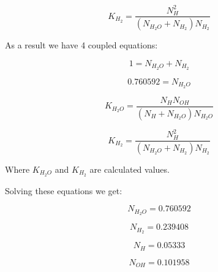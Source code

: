 \documentclass[12pt, Times New Roman]{article}
\begin{document}
    \begin{equation}
        K_{H_{2}} = \frac{N_{H}^{2}}{(N_{H_{2}O} + N_{H_{2}}) N_{H_{2}}}
    \end{equation}

    As a result we have 4 coupled equations:

    \begin{equation}
        1 = N_{H_{2}O} + N_{H_{2}}
    \end{equation}

    \begin{equation}
        0.760592 = N_{H_{2}O}
    \end{equation}

    \begin{equation}
        K_{H_{2}O} = \frac{N_{H} N_{OH}}{(N_{H} + N_{H_{2}O}) N_{H_{2}O}}
    \end{equation}

    \begin{equation}
        K_{H_{2}} = \frac{N_{H}^{2}}{(N_{H_{2}O} + N_{H_{2}}) N_{H_{2}}}
    \end{equation}

    Where $K_{H_{2}O}$ and $K_{H_{2}}$ are calculated values.
    
    Solving these equations we get:

    \begin{equation}
        N_{H_{2}O} = 0.760592
    \end{equation}

    \begin{equation}
        N_{H_{2}} = 0.239408
    \end{equation}

    \begin{equation}
        N_{H} = 0.05333
    \end{equation}

    \begin{equation}
        N_{OH} = 0.101958
    \end{equation}
\end{document}
